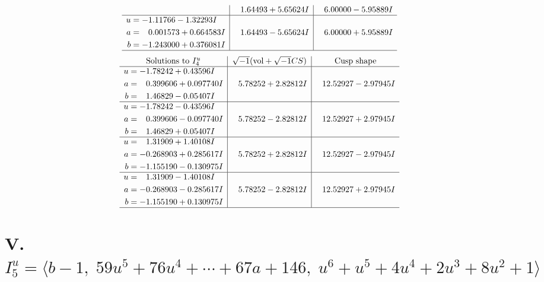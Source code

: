 \documentclass[1p]{elsarticle_modified}
\theoremstyle{definition}
\newcommand{\I}{\sqrt{-1}}
\begin{document}
$$\begin{array}{c|c|c}
 & \phantom{-}1.64493 + 5.65624 I & \phantom{-}6.00000 - 5.95889 I \\ \hline\begin{aligned}
u &= -1.11766 - 1.32293 I \\
a &= \phantom{-}0.001573 + 0.664583 I \\
b &= -1.243000 + 0.376081 I\end{aligned}
 & \phantom{-}1.64493 - 5.65624 I & \phantom{-}6.00000 + 5.95889 I\\
 \hline 
 \end{array}$$\newpage$$\begin{array}{c|c|c}  
\text{Solutions to }I^u_{4}& \I (\text{vol} + \sqrt{-1}CS) & \text{Cusp shape}\\
 \hline 
\begin{aligned}
u &= -1.78242 + 0.43596 I \\
a &= \phantom{-}0.399606 + 0.097740 I \\
b &= \phantom{-}1.46829 - 0.05407 I\end{aligned}
 & \phantom{-}5.78252 + 2.82812 I & \phantom{-}12.52927 - 2.97945 I \\ \hline\begin{aligned}
u &= -1.78242 - 0.43596 I \\
a &= \phantom{-}0.399606 - 0.097740 I \\
b &= \phantom{-}1.46829 + 0.05407 I\end{aligned}
 & \phantom{-}5.78252 - 2.82812 I & \phantom{-}12.52927 + 2.97945 I \\ \hline\begin{aligned}
u &= \phantom{-}1.31909 + 1.40108 I \\
a &= -0.268903 + 0.285617 I \\
b &= -1.155190 - 0.130975 I\end{aligned}
 & \phantom{-}5.78252 + 2.82812 I & \phantom{-}12.52927 - 2.97945 I \\ \hline\begin{aligned}
u &= \phantom{-}1.31909 - 1.40108 I \\
a &= -0.268903 - 0.285617 I \\
b &= -1.155190 + 0.130975 I\end{aligned}
 & \phantom{-}5.78252 - 2.82812 I & \phantom{-}12.52927 + 2.97945 I\\
 \hline 
 \end{array}$$\newpage\newpage\renewcommand{\arraystretch}{1}
\centering \section*{V. $I^u_{5}= \langle b-1,\;59 u^5+76 u^4+\cdots+67 a+146,\;u^6+u^5+4 u^4+2 u^3+8 u^2+1 \rangle$}
\end{document}
